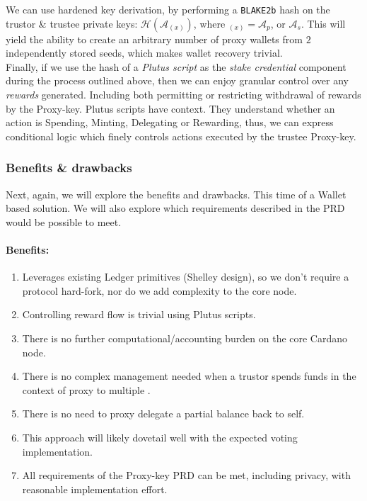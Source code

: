 \documentclass[11pt,a4paper]{article}
\begin{document}
We can use hardened key derivation, by performing a \lstinline{BLAKE2b} hash on the \gls{trustor} \& \gls{trustee}
private keys: $\mathcal{H}(\mathcal{A}_{(x)})$, where $_{(x)}=\mathcal{A}_p$, or $\mathcal{A}_s$. 
This will yield the ability to create an arbitrary number of proxy wallets from $2$ independently
stored seeds, which makes wallet recovery trivial. \\

Finally, if we use the hash of a \emph{Plutus script} as the \emph{stake credential} component during the process outlined
above, then we can enjoy granular control over any \emph{rewards} generated. Including both permitting or restricting
withdrawal of rewards by the Proxy-key. Plutus scripts have context. They understand whether an action is Spending, 
Minting, Delegating or Rewarding, thus, we can express conditional logic which finely controls actions executed by the \gls{trustee} Proxy-key.

\pagebreak

\subsubsection{Benefits \& drawbacks}
Next, again, we will explore the benefits and drawbacks. This time of a Wallet based solution. We will also explore
which requirements described in the PRD would be possible to meet.

\paragraph{Benefits:}
\begin{enumerate} 
  \item Leverages existing Ledger primitives (Shelley design), so we don't require a protocol hard-fork, nor do we add complexity to the core node.
  \item Controlling reward flow is trivial using Plutus scripts.
  \item There is no further computational/accounting burden on the core Cardano node. 
  \item There is no complex management needed when a \gls{trustor} spends funds in the context of proxy to multiple .
  \item There is no need to proxy delegate a partial balance back to self.
  \item This approach will likely dovetail well with the expected voting implementation.
  \item All requirements of the Proxy-key PRD can be met, including privacy, with reasonable implementation effort.
\end{enumerate}
\end{document}

